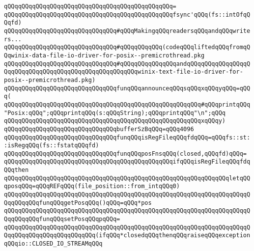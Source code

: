 \verb|qQQqqQQqqQQqqQQqqQQqqQQqqQQqqQQqqQQqqQQqqQQqqQQq=|\newline
\verb|qQQqqQQqqQQqqQQqqQQqqQQqqQQqqQQqqQQqqQQqqQQqqQQqfsync'qQQq(fs::intOfqQQqfd)|\newline
\newline
\newline
\newline
\verb|qQQqqQQqqQQqqQQqqQQqqQQqqQQqqQQq#qQQqMakingqQQqreadersqQQqandqQQqwriters...|\newline
\verb|qQQqqQQqqQQqqQQqqQQqqQQqqQQqqQQq#qQQqqQQqqQQq(codeqQQqliftedqQQqfromqQQqwinix-data-file-io-driver-for-posix--premicrothread.pkg|\newline
\verb|qQQqqQQqqQQqqQQqqQQqqQQqqQQqqQQq#qQQqqQQqqQQqqQQqandqQQqqQQqqQQqqQQqqQQqqQQqqQQqqQQqqQQqqQQqqQQqqQQqqQQqqQQqwinix-text-file-io-driver-for-posix--premicrothread.pkg)|\newline
\newline
\verb|qQQqqQQqqQQqqQQqqQQqqQQqqQQqqQQqfunqQQqannounceqQQqsqQQqxqQQqyqQQq=qQQq(|\newline
\verb|qQQqqQQqqQQqqQQqqQQqqQQqqQQqqQQqqQQqqQQqqQQqqQQqqQQqqQQq#qQQqprintqQQq"Posix:qQQq";qQQqprintqQQq(s:qQQqString);qQQqprintqQQq"\n";qQQq|\newline
\verb|qQQqqQQqqQQqqQQqqQQqqQQqqQQqqQQqqQQqqQQqqQQqqQQqqQQqqQQqxqQQqy)|\newline
\newline
\verb|qQQqqQQqqQQqqQQqqQQqqQQqqQQqqQQqbufferSzBqQQq=qQQq4096|\newline
\newline
\verb|qQQqqQQqqQQqqQQqqQQqqQQqqQQqqQQqfunqQQqisRegFileqQQqfdqQQq=qQQqfs::st::isRegqQQq(fs::fstatqQQqfd)|\newline
\newline
\verb|qQQqqQQqqQQqqQQqqQQqqQQqqQQqqQQqfunqQQqposFnsqQQq(closed,qQQqfd)qQQq=|\newline
\verb|qQQqqQQqqQQqqQQqqQQqqQQqqQQqqQQqqQQqqQQqqQQqqQQqifqQQqisRegFileqQQqfdqQQqthen|\newline
\verb|qQQqqQQqqQQqqQQqqQQqqQQqqQQqqQQqqQQqqQQqqQQqqQQqqQQqqQQqqQQqqQQqletqQQqposqQQq=qQQqREFqQQq(file_position::from_intqQQq0)|\newline
\verb|qQQqqQQqqQQqqQQqqQQqqQQqqQQqqQQqqQQqqQQqqQQqqQQqqQQqqQQqqQQqqQQqqQQqqQQqqQQqqQQqfunqQQqgetPosqQQq()qQQq=qQQq*pos|\newline
\verb|qQQqqQQqqQQqqQQqqQQqqQQqqQQqqQQqqQQqqQQqqQQqqQQqqQQqqQQqqQQqqQQqqQQqqQQqqQQqqQQqfunqQQqsetPosqQQqpqQQq=|\newline
\verb|qQQqqQQqqQQqqQQqqQQqqQQqqQQqqQQqqQQqqQQqqQQqqQQqqQQqqQQqqQQqqQQqqQQqqQQqqQQqqQQqqQQqqQQqqQQqqQQq(ifqQQq*closedqQQqthenqQQqraiseqQQqexceptionqQQqio::CLOSED_IO_STREAMqQQq|\newline
